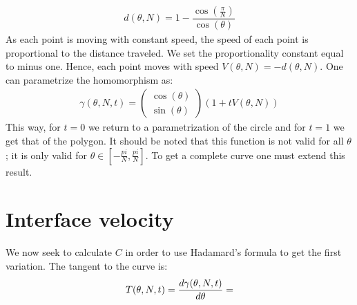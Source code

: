 \documentclass[../main.tex]{subfiles}
\begin{document}
		\begin{gather}
			d(\theta,N)=1-\dfrac{\cos\left(\frac{\pi}{N}\right)}{\cos\left(\theta\right)}
		\end{gather}
		As each point is moving with constant speed, the speed of each point is proportional to the distance traveled. We set the proportionality constant equal to minus one. Hence, each point moves with speed $ V(\theta,N)=-d(\theta,N) $. One can parametrize the homomorphism as:
		\begin{gather}
		\gamma\left(\theta,N,t\right)=
		\left(\begin{array}{c}
		\cos(\theta) \\ 
		\sin(\theta)
		\end{array}\right)(1+tV(\theta,N))
		\end{gather}
		This way, for $ t=0 $ we return to a parametrization of the circle and for $ t=1 $ we get that of the polygon. It should be noted that this function is not valid for all $ \theta $; it is only valid for $ \theta \in\left[-\frac{pi}{N},\frac{pi}{N}\right] $. To get a complete curve one must extend this result.
		\section{Interface velocity}
		We now seek to calculate $ C $ in order to use Hadamard's formula to get the first variation. The tangent to the curve is:
		\begin{gather}
		T(\theta,N,t)=\dfrac{d\gamma(\theta,N,t)}{d\theta}=
		\end{gather}
\end{document}
